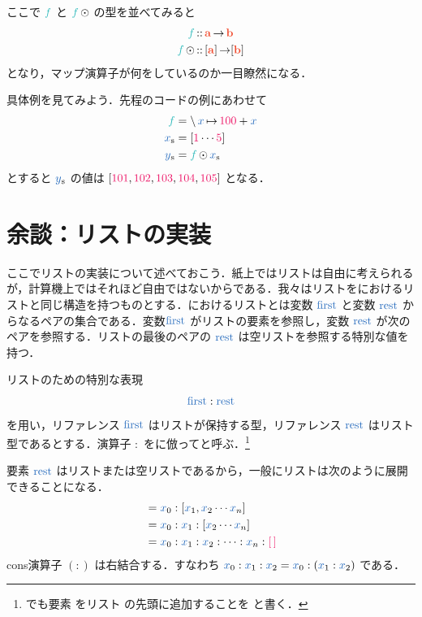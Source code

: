 \documentclass[a5paper,twoside,fleqn,draft]{jsbook}
\begin{document}
ここで $\hFunc{f}$ と $\hFunc{f}\mMapList$ の型を並べてみると
\begin{align}
  \hFunc{f}
  &\mIn\mA\mFuncArrow\mB\\
  \hFunc{f}\mMapList
  &\mIn{}[\mA]\mFuncArrow[\mB]
\end{align}
となり，マップ演算子が何をしているのか一目瞭然になる．


具体例を見てみよう．先程の\python コードの例にあわせて
\begin{align}
  \hFunc{f}
  &=\mLambda\hVar{x}\mLambdaArrow\hConstant{100}+\hVar{x}\\
  \mList{x}
  &=[\hConstant{1}\dotsb\mFiveNumber]\\
  \mList{y}
  &=\hFunc{f}\mMapList\mList{x}
\end{align}
とすると $\mList{y}$ の値は $[\hConstant{101},\hConstant{102},\hConstant{103},\hConstant{104},\hConstant{105}]$ となる．

\section{余談：リストの実装}

ここでリストの実装について述べておこう．紙上ではリストは自由に考えられるが，計算機上ではそれほど自由ではないからである．我々はリストを\lisp におけるリストと同じ構造を持つものとする．\lisp におけるリストとは変数 $\mFirstVar$ と変数 $\mRestVar$ からなるペアの集合である．変数$\mFirstVar$ がリストの要素を参照し，変数 $\mRestVar$ が次のペアを参照する．リストの最後のペアの $\mRestVar$ は空リストを参照する特別な値を持つ．

リストのための特別な表現
\begin{equation}
  \mFirstVar:\mRestVar
\end{equation}
を用い，リファレンス $\mFirstVar$ はリストが保持する型，リファレンス $\mRestVar$ はリスト型であるとする．演算子 $:$ を\lisp に倣ってと呼ぶ．\footnote{\haskell でも要素  をリスト  の先頭に追加することを  と書く．}

要素 $\mRestVar$ はリストまたは空リストであるから，一般にリストは次のように展開できることになる．
\begin{align}
  [\hVar{x}_0,\hVar{x}_1,\hVar{x}_2\dotsb \hVar{x}_n]
  &=\hVar{x}_0:[\hVar{x}_1,\hVar{x}_2\dotsb \hVar{x}_n]\\
  &=\hVar{x}_0:\hVar{x}_1:[\hVar{x}_2\dotsb \hVar{x}_n]\\
  &=\hVar{x}_0:\hVar{x}_1:\hVar{x}_2:\dotsb:\hVar{x}_n:\mEmptyList
\end{align}
cons演算子 $(:)$ は右結合する．すなわち $\hVar{x}_0:\hVar{x}_1:\hVar{x}_2=\hVar{x}_0:(\hVar{x}_1:\hVar{x}_2)$ である．
\end{document}
